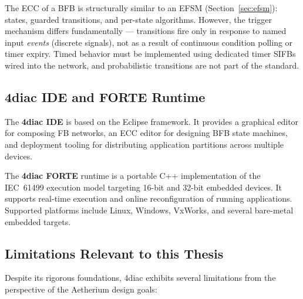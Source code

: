 The ECC of a BFB is structurally similar to an EFSM (Section~\ref{sec:efsm}): states, guarded transitions, and per-state algorithms. However, the trigger mechanism differs fundamentally --- transitions fire only in response to named input \textit{events} (discrete signals), not as a result of continuous condition polling or timer expiry. Timed behavior must be implemented using dedicated timer SIFBs wired into the network, and probabilistic transitions are not part of the standard.

\subsection{4diac IDE and FORTE Runtime}

The \textbf{4diac IDE} is based on the Eclipse framework. It provides a graphical editor for composing FB networks, an ECC editor for designing BFB state machines, and deployment tooling for distributing application partitions across multiple devices.

The \textbf{4diac FORTE} runtime is a portable C++ implementation of the IEC~61499 execution model targeting 16-bit and 32-bit embedded devices. It supports real-time execution and online reconfiguration of running applications. Supported platforms include Linux, Windows, VxWorks, and several bare-metal embedded targets.

\subsection{Limitations Relevant to this Thesis}

Despite its rigorous foundations, 4diac exhibits several limitations from the perspective of the Aetherium design goals:

